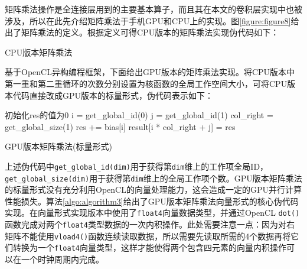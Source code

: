矩阵乘法操作是全连接层用到的主要基本算子，而且其在本文的卷积层实现中也被涉及，所以在此先介绍矩阵乘法于手机GPU和CPU上的实现。图\ref{figure:figure8}给出了矩阵乘法的定义。根据定义可得CPU版本的矩阵乘法实现伪代码如下：

\begin{algorithm}[htbp]
  \small
  \SetAlgoLined
    \begin{spacing}{0.9}
    \end{spacing}
  \caption{CPU版本矩阵乘法}
  \label{algo:algorithm1}
\end{algorithm}

基于OpenCL异构编程框架，下面给出GPU版本的矩阵乘法实现。将CPU版本中第一重和第二重循环的次数分别设置为核函数的全局工作空间大小，可将CPU版本代码直接改成GPU版本的标量形式，伪代码表示如下：

\begin{algorithm}[htbp]
  \small
  \SetAlgoLined
    \begin{spacing}{0.9}
    初始化res的值为0\;
  i = get\_global\_id(0)\;
  j = get\_global\_id(1)\;
  col\_right = get\_global\_size(1)\;
    res += bias[i]\;
  result[i * col\_right + j] = res\;
    \end{spacing}
  \caption{GPU版本矩阵乘法(标量形式)}
  \label{algo:algorithm2}
\end{algorithm}

上述伪代码中\texttt{get\_global\_id(dim)}用于获得第\texttt{dim}维上的工作项全局ID，\texttt{get\_global\_size(dim)}用于获得第\texttt{dim}维上的全局工作项个数。GPU版本矩阵乘法的标量形式没有充分利用OpenCL的向量处理能力，这会造成一定的GPU并行计算性能损失。算法\ref{algo:algorithm3}给出了GPU版本矩阵乘法向量形式的核心伪代码实现。在向量形式实现版本中使用了\texttt{float4}向量数据类型，并通过OpenCL \texttt{dot()}函数完成对两个\texttt{float4}类型数据的一次内积操作。此处需要注意一点：因为对右矩阵不能使用\texttt{vload4()}函数连续读取数据，所以需要先读取所需的4个数据再将它们转换为一个\texttt{float4}向量类型，这样才能使得两个包含四元素的向量内积操作可以在一个时钟周期内完成。

